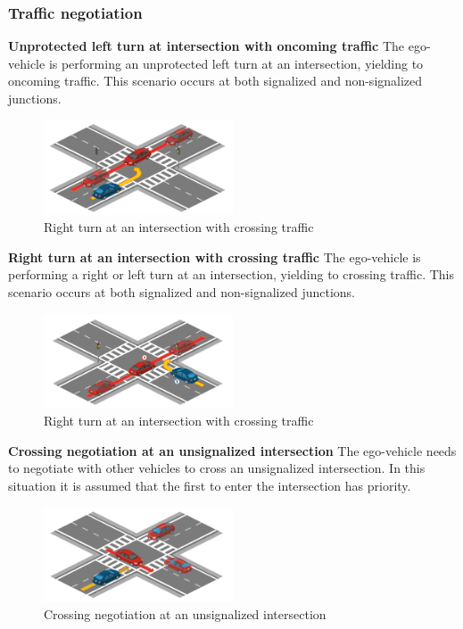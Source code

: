 \documentclass{article}
\begin{document}
\subsubsection{Traffic negotiation}
\textbf{Unprotected left turn at intersection with oncoming traffic}
The ego-vehicle is performing an unprotected left turn at an intersection, yielding to oncoming traffic. This scenario occurs at both signalized and non-signalized junctions.
\begin{figure}[h]
    \centering
    \includegraphics[width=0.5\textwidth]{img/TR08.png}
    \caption{Right turn at an intersection with crossing traffic} \label{Scenario_trafficNegtiation}
\end{figure}

\textbf{Right turn at an intersection with crossing traffic} 
The ego-vehicle is performing a right or left turn at an intersection, yielding to crossing traffic. This scenario occurs at both signalized and non-signalized junctions.
\begin{figure}[h]
    \centering
    \includegraphics[width=0.5\textwidth]{img/TR09.png}
    \caption{Right turn at an intersection with crossing traffic} \label{Scenario_trafficNegtiation}
\end{figure}

\textbf{Crossing negotiation at an unsignalized intersection} 
The ego-vehicle needs to negotiate with other vehicles to cross an unsignalized intersection. In this situation it is assumed that the first to enter 
the intersection has priority.
\begin{figure}[h]
    \centering
    \includegraphics[width=0.5\textwidth]{img/TR10.png}
    \caption{Crossing negotiation at an unsignalized intersection} \label{Scenario_crossingNegotiation}
\end{figure}
\end{document}
